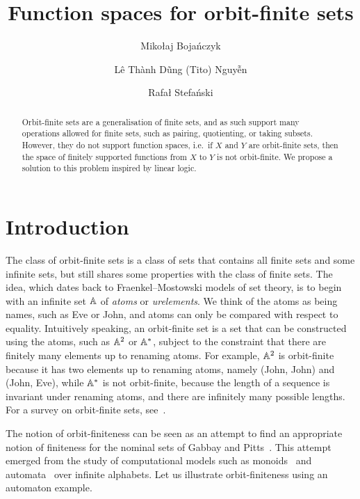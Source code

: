 \documentclass[a4paper,UKenglish,cleveref, autoref, numberwithinsect, thm-restate]{lipics-v2021}
\title{Function spaces for orbit-finite sets} %
\author{Mikołaj Bojańczyk}{University of Warsaw, Poland \and \url{https://www.mimuw.edu.pl/~bojan/}}{bojan@mimuw.edu.pl}{}{}%
\author{Lê Thành Dũng (Tito) Nguy\~{\^{e}}n}{École normale supérieure de Lyon, France \and \url{https://nguyentito.eu/}}{nltd@nguyentito.eu}{https://orcid.org/0000-0002-6900-5577}{Supported by the LABEX MILYON (ANR-10-LABX-0070) of Université de Lyon, within the program ``France 2030'' (ANR-11-IDEX-0007) operated by the French National Research Agency (ANR).}
\author{Rafał Stefański}{University of Warsaw, Poland}{rafal.stefanski@mimuw.edu.pl}{}{}%
\begin{document}
\newcommand{\loli}{\multimap}


\maketitle 
\begin{abstract}
    Orbit-finite sets are a generalisation of finite sets, and as such support many operations allowed for finite sets, such as pairing, quotienting, or taking subsets. However, they do not support function spaces, i.e.~if $X$ and $Y$ are orbit-finite sets, then the space of finitely supported functions from $X$ to $Y$ is not orbit-finite. We propose a solution to this problem inspired by linear logic.
\end{abstract}

\section{Introduction}
The class of orbit-finite sets is a class of sets that contains all finite sets and some infinite sets, but still shares some properties with the class of finite sets.  The idea, which dates back to Fraenkel--Mostowski models of set theory,  is to begin with an infinite set $\mathbb A$ of \emph{atoms} or \emph{urelements}. We think of the atoms as being names, such as Eve or John, and atoms can only be compared with respect to equality. Intuitively speaking, an  orbit-finite set is a set  that can be constructed using the atoms, such as $\mathbb A^2$ or $\mathbb A^*$, subject to the constraint that there are finitely many elements up to  renaming atoms. For example, $\mathbb A^2$ is orbit-finite because it has two elements up to renaming atoms, namely (John, John) and (John, Eve), while $\mathbb A^*$ is not orbit-finite, because the length of a sequence is invariant under renaming atoms, and there are infinitely many possible lengths. For a survey on orbit-finite sets, see~\cite{bojanczyk_slightly2018}.

The notion of orbit-finiteness can be seen as an attempt to find an appropriate notion of finiteness for the  nominal sets of Gabbay and Pitts~\cite{PittsAM:nomsns}.  This attempt emerged from the study of computational models such as monoids~\cite{bojanczykNominalMonoids2013} and automata~\cite{bojanczykAutomataTheoryNominal2014} over infinite alphabets. Let us illustrate orbit-finiteness using an automaton example. 
\end{document}

